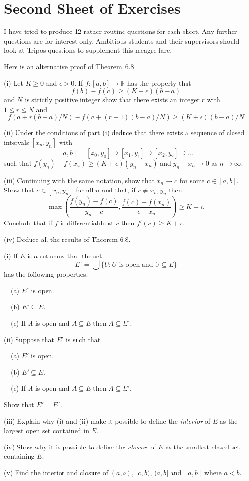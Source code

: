 \newpage
\section{Second Sheet of Exercises}
I have tried to
produce 12 rather routine questions for each sheet.
Any further questions are for interest
only. Ambitious
students and their supervisors should look at Tripos
questions to supplement this meagre fare.

\vspace{1\baselineskip}

\begin{question}
Here is an alternative proof of Theorem~6.8

(i) Let $K\geq 0$ and $\epsilon>0$.
If $f:[a,b]\rightarrow{\mathbb R}$  has the property
that
\[f(b)-f(a)\geq (K+\epsilon)(b-a)\]
and $N$ is strictly
positive integer show that there exists an integer $r$
with $1\leq r\leq N$ and
\[f(a+r(b-a)/N)-f(a+(r-1)(b-a)/N)\geq (K+\epsilon)(b-a)/N\]

(ii) Under the conditions of part (i) deduce that there
exists a sequence of closed intervals $[x_{n},y_{n}]$
with
\[[a,b]=[x_{0},y_{0}]\supseteq [x_{1},y_{1}]\supseteq
[x_{2},y_{2}]\supseteq \dots\]
such that $f(y_{n})-f(x_{n})\geq (K+\epsilon)(y_{n}-x_{n})$
and $y_{n}-x_{n}\rightarrow 0$ as $n\rightarrow\infty$.

(iii) Continuing with the same notation, show that
$x_{n}\rightarrow c$ for some $c\in [a,b]$. Show
that $c\in [x_{n},y_{n}]$ for all $n$ and that,
if $c\neq x_{n},y_{n}$ then
\[\max\left(
\frac{f(y_{n})-f(c)}{y_{n}-c},
\frac{f(c)-f(x_{n})}{c-x_{n}}
\right)\geq K+\epsilon.\]
Conclude that if $f$ is differentiable at $c$ then
$f'(c)\geq K+\epsilon$.

(iv) Deduce all the results of Theorem 6.8.

\end{question}
\begin{question} (i) If $E$ is a set show that the set
\[E^{\circ}=\bigcup\{U:\text{$U$ is open and $U\subseteq E$}\}\]
has the following properties.

\ \ (a) $E^{\circ}$ is open.

\ \ (b) $E^{\circ}\subseteq E$.

\ \ (c) If $A$ is open and $A\subseteq E$
then $A\subseteq E^{\circ}$.

(ii) Suppose that $E'$ is such that

\ \ (a) $E'$ is open.

\ \ (b) $E'\subseteq E$.

\ \ (c) If $A$ is open and $A\subseteq E$
then $A\subseteq E'$.

\noindent
Show that $E'=E^{\circ}$.

(iii) Explain why (i) and (ii) make it possible to define
the \emph{interior} of $E$ as the largest open set
contained in $E$.

(iv) Show why it is possible to define the
\emph{closure} of $E$ as the smallest closed set
containing $E$.

(v) Find the interior and closure of $(a,b)$, $[a,b)$,
$(a,b]$ and $[a,b]$ where $a<b$.

\end{question}
